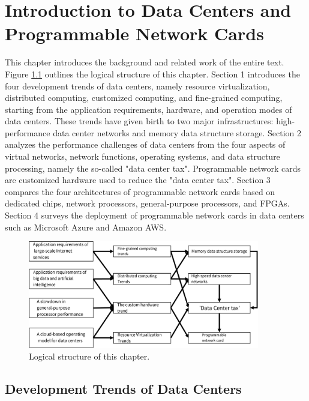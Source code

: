 \chapter{Introduction to Data Centers and Programmable Network Cards}
\label{chapter:background}

This chapter introduces the background and related work of the entire text. Figure \ref{background:fig:overview} outlines the logical structure of this chapter. Section 1 introduces the four development trends of data centers, namely resource virtualization, distributed computing, customized computing, and fine-grained computing, starting from the application requirements, hardware, and operation modes of data centers. These trends have given birth to two major infrastructures: high-performance data center networks and memory data structure storage. Section 2 analyzes the performance challenges of data centers from the four aspects of virtual networks, network functions, operating systems, and data structure processing, namely the so-called "data center tax". Programmable network cards are customized hardware used to reduce the "data center tax". Section 3 compares the four architectures of programmable network cards based on dedicated chips, network processors, general-purpose processors, and FPGAs. Section 4 surveys the deployment of programmable network cards in data centers such as Microsoft Azure and Amazon AWS.

\begin{figure}[htbp]
	\centering
	\includegraphics[width=0.9\textwidth]{figures/background_overview.pdf}
	\caption{Logical structure of this chapter.}
	\label{background:fig:overview}
\end{figure}

\section{Development Trends of Data Centers}
\label{background:sec:trend}

